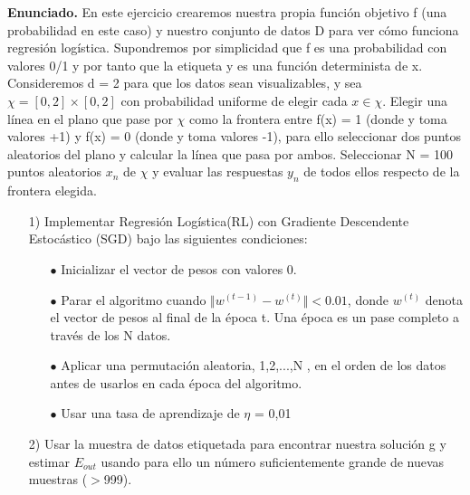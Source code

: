 \documentclass[a4paper,11pt]{article}
\begin{document}
\textbf{Enunciado.} En este ejercicio crearemos nuestra propia función objetivo f (una probabilidad en este caso) y nuestro conjunto de datos D para ver cómo funciona regresión logística. Supondremos por simplicidad que f es una probabilidad con valores 0/1 y por tanto que la etiqueta y es una función determinista de x.\\

Consideremos d = 2 para que los datos sean visualizables, y sea $\chi = [0, 2] \times [0, 2]$ con probabilidad uniforme de elegir cada $x \in \chi$. Elegir una línea en el plano que pase por $\chi$ como la frontera entre f(x) = 1 (donde y toma valores +1) y f(x) = 0 (donde y toma valores -1), para ello seleccionar dos puntos aleatorios del plano y calcular
la línea que pasa por ambos. Seleccionar N = 100 puntos aleatorios ${x}_n$ de $\chi$ y evaluar las respuestas ${y}_n$ de todos ellos respecto de la frontera elegida.

\begin{itemize}

\item[1)]Implementar Regresión Logística(RL) con Gradiente Descendente Estocástico (SGD) bajo las siguientes condiciones:

\begin{itemize}

\item[$\bullet$] Inicializar el vector de pesos con valores 0.

\item[$\bullet$]Parar el algoritmo cuando $\Vert w^{(t-1)} - w^{(t)} \Vert < 0.01$, donde $w^{(t)}$ denota el vector de pesos al final de la época t. Una época es un pase completo a través de los N datos.

\item[$\bullet$] Aplicar una permutación aleatoria, 1,2,...,N , en el orden de los datos antes de usarlos en cada época del algoritmo.

\item[$\bullet$] Usar una tasa de aprendizaje de $\eta$ = 0,01

\end{itemize}

\item[2)] Usar la muestra de datos etiquetada para encontrar nuestra solución g y estimar $E_{out}$ usando para ello un número suficientemente grande de nuevas muestras ($>$999).

\end{itemize}
\end{document}
